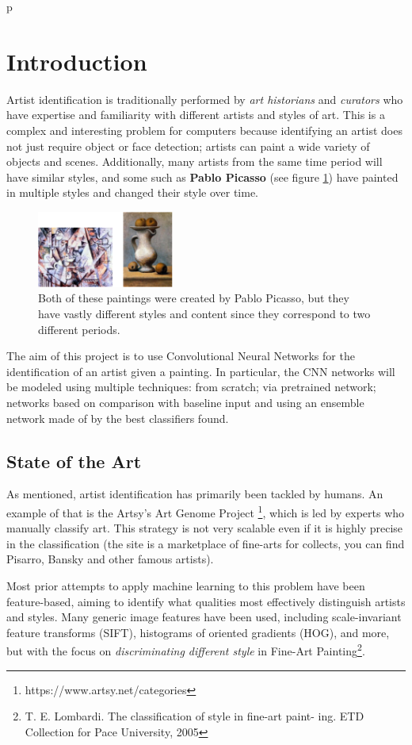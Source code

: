 p\section{Introduction}
Artist identification is traditionally performed by \textit{art historians} and \textit{curators} who have expertise and familiarity with different artists and styles of art. This is a complex and interesting problem for computers because identifying an artist does not just require object or face detection; artists can paint a wide variety of objects and scenes. Additionally, many artists from the same time period will have similar styles, and some such as \textbf{Pablo Picasso} (see figure \ref{fig:picasso}) have painted in multiple styles and changed their style over time.

\begin{figure}[H]
	\centering
	\includegraphics[width=0.4\textwidth]{img/picasso.png}
	\caption{Both of these paintings were created by Pablo Picasso, but they have vastly different styles and content since they correspond to two different periods.}
	\label{fig:picasso}
\end{figure}

\noindent The aim of this project is to use Convolutional Neural Networks for the identification of an artist given a painting. In particular, the CNN networks will be modeled using multiple techniques: from scratch; via pretrained network; networks based on comparison with baseline input and using an ensemble network made of by the best classifiers found.


\subsection{State of the Art}
As mentioned, artist identification has primarily been tackled by humans. An example of that is the Artsy's Art Genome Project \footnote{https://www.artsy.net/categories}, which is led by experts who manually classify art. This strategy is not very scalable even if it is highly precise in the classification (the site is a marketplace of fine-arts for collects, you can find Pisarro, Bansky and other famous artists).

Most prior attempts to apply machine learning to this problem have been feature-based, aiming to identify what qualities most effectively distinguish artists and styles. Many generic image features have been used, including scale-invariant feature transforms (SIFT), histograms of oriented gradients (HOG), and more, but with the focus on \textit{discriminating different style} in Fine-Art Painting\footnote{T. E. Lombardi. The classification of style in fine-art paint-
ing. ETD Collection for Pace University, 2005}.

